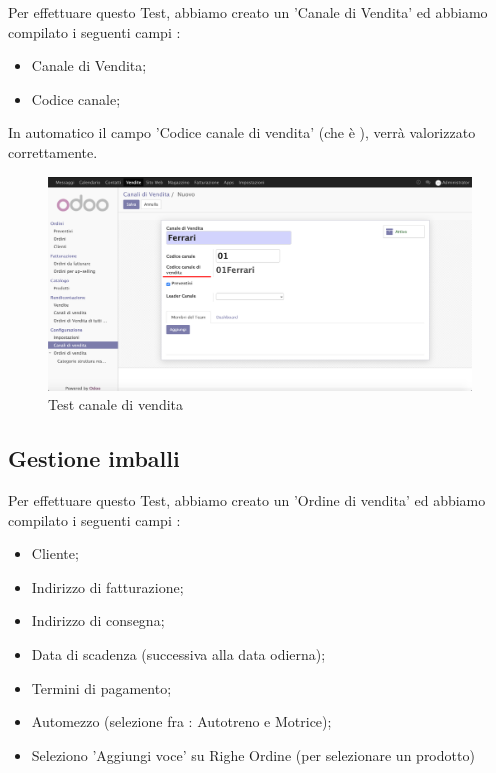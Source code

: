 \vspace*{0.5cm}
Per effettuare questo Test, abbiamo creato un 'Canale di Vendita' ed abbiamo compilato i seguenti campi :
\begin{itemize}
\item Canale di Vendita;
\item Codice canale;
\end{itemize}
\newpage
In automatico il campo 'Codice canale di vendita' (che è ), verrà valorizzato correttamente.
  
\begin{figure}[H]
	\begin{center} \includegraphics[scale=0.3]{figures/fourth_test}
		\caption[Test canale di vendita]{Test canale di vendita}
		\label{fig:fourth_test}
	\end{center}
\end{figure}


\subsection{Gestione imballi}

Per effettuare questo Test, abbiamo creato un 'Ordine di vendita' ed abbiamo compilato i seguenti campi :
\begin{itemize}
	\item Cliente;
	\item Indirizzo di fatturazione;
	\item Indirizzo di consegna;
	\item Data di scadenza (successiva alla data odierna);
	\item Termini di pagamento;
	\item Automezzo (selezione fra : Autotreno e Motrice);
	\item Seleziono 'Aggiungi voce' su Righe Ordine (per selezionare un prodotto)
\end{itemize}

